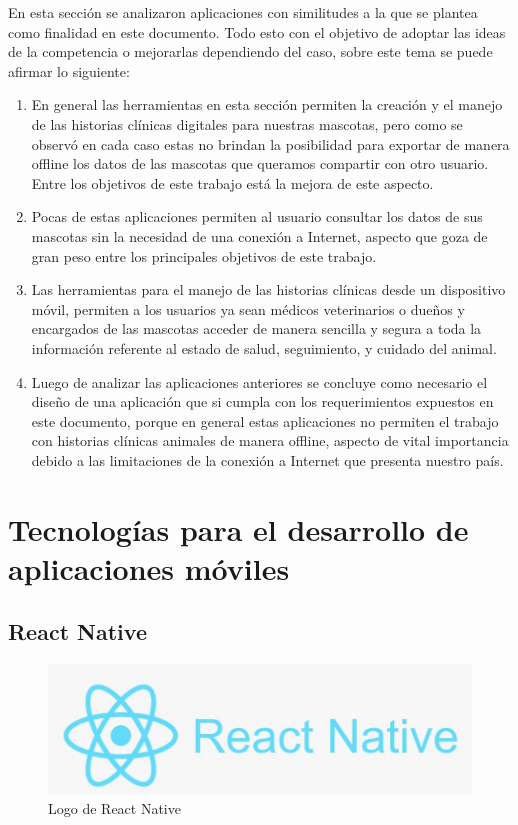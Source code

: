 En esta sección se analizaron aplicaciones con similitudes a la que se plantea como finalidad en este documento. Todo esto con el objetivo de adoptar las ideas de la competencia o mejorarlas dependiendo del caso, sobre este tema se puede afirmar lo siguiente:

\begin{enumerate}


\item	En general las herramientas en esta sección permiten la creación y el manejo de las historias clínicas digitales para nuestras mascotas, pero como se observó en cada caso estas no brindan la posibilidad para exportar de manera offline los datos de las mascotas que queramos compartir con otro usuario. Entre los objetivos de este trabajo está la mejora de este aspecto.
\item	Pocas de estas aplicaciones permiten al usuario consultar los datos de sus mascotas sin la necesidad de una conexión a Internet, aspecto que goza de gran peso entre los principales objetivos de este trabajo.
\item	Las herramientas para el manejo de las historias clínicas desde un dispositivo móvil, permiten a los usuarios ya sean médicos veterinarios o dueños y encargados de las mascotas acceder de manera sencilla y segura a toda la información referente al estado de salud, seguimiento, y cuidado del animal.
\item	Luego de analizar las aplicaciones anteriores se concluye como necesario el diseño de una aplicación que si cumpla con los requerimientos expuestos en este documento, porque en general estas aplicaciones no permiten el trabajo con historias clínicas animales de manera offline, aspecto de vital importancia debido a las limitaciones de la conexión a Internet que presenta nuestro país.
\end{enumerate}

\section{Tecnologías para el desarrollo de aplicaciones móviles}\label{chapter:introduction}

\subsection{React Native}\label{chapter:introduction}



\begin{figure}[h!]
\begin{center}
\includegraphics[scale=0.5]{Graphics/images/LogodeReactNative.jpg}
\caption{Logo de React Native}
\label{fig:dh}

\end{center}
\end{figure}


